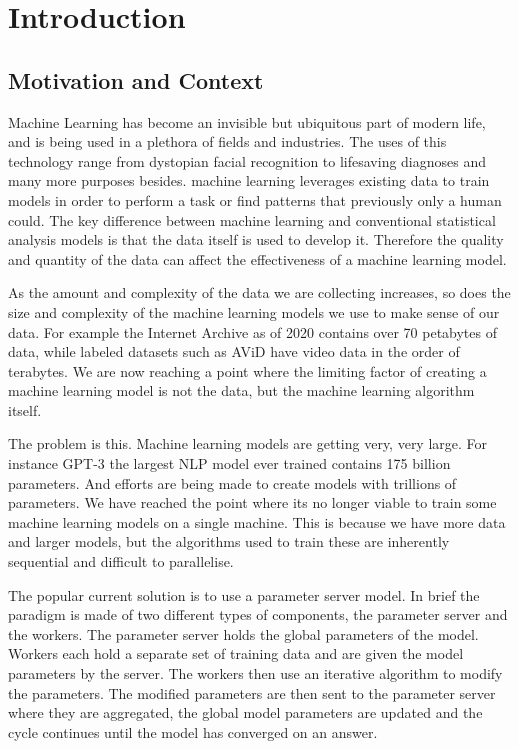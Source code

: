 
\section{Introduction}

\subsection{Motivation and Context}

Machine Learning has become an invisible but ubiquitous part of modern life, and
is being used in a plethora of fields and industries. The uses of this
technology range from dystopian facial recognition
\cite{mattBurgessFacialRecognision} to lifesaving diagnoses
\cite{Mammograms2020} and many more purposes besides. machine learning leverages
existing data to train models in order to perform a task or find patterns that
previously only a human could. The key difference between machine learning and
conventional statistical analysis models is that the data itself is used to
develop it. Therefore the quality and quantity of the data can affect the
effectiveness of a machine learning model.
\par
As the amount and complexity of the data we are collecting increases, so does the
size and complexity of the machine learning models we use to make sense of our
data. For example the Internet Archive as of 2020 contains over 70 petabytes of
data, while labeled datasets such as AViD have video data in the order of
terabytes. \cite{piergiovanni2020avid} We are now reaching a point where the
limiting factor of creating a machine learning model is not the data, but the
machine learning algorithm itself.
\par
The problem is this. Machine learning models are getting very, very large. For
instance GPT-3 the largest NLP model ever trained contains 175 billion
parameters. \cite{fewshowlearners2020gpt} And efforts are being made to create
models with trillions of parameters. \cite{rajbhandari2020zero} We have reached
the point where its no longer viable to train some machine learning models on a
single machine.\cite{LI2014ParameterServers} This is because we have more data
and larger models, but the algorithms used to train these are inherently
sequential and difficult to parallelise.
\par
The popular current solution is to use a parameter server model. In brief the
paradigm is made of two different types of components, the parameter server and
the workers. The parameter server holds the global parameters of the model.
Workers each hold a separate set of training data and are given the model
parameters by the server. The workers then use an iterative algorithm to modify
the parameters. The modified parameters are then sent to the parameter server
where they are aggregated, the global model parameters are updated and the cycle
continues until the model has converged on an answer.

